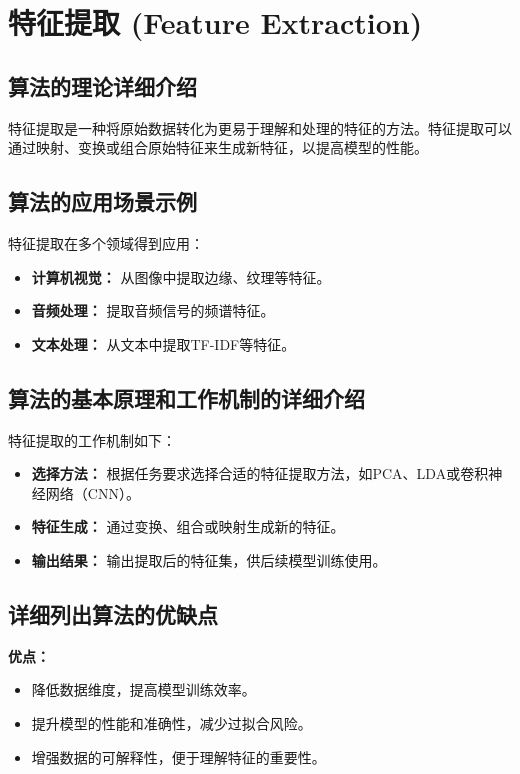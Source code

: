 \section{特征提取 (Feature Extraction)}
\subsection*{算法的理论详细介绍}
特征提取是一种将原始数据转化为更易于理解和处理的特征的方法。特征提取可以通过映射、变换或组合原始特征来生成新特征，以提高模型的性能。

\subsection*{算法的应用场景示例}
特征提取在多个领域得到应用：
\begin{itemize}
    \item \textbf{计算机视觉：} 从图像中提取边缘、纹理等特征。
    \item \textbf{音频处理：} 提取音频信号的频谱特征。
    \item \textbf{文本处理：} 从文本中提取TF-IDF等特征。
\end{itemize}

\subsection*{算法的基本原理和工作机制的详细介绍}
特征提取的工作机制如下：
\begin{itemize}
    \item \textbf{选择方法：} 根据任务要求选择合适的特征提取方法，如PCA、LDA或卷积神经网络（CNN）。
    \item \textbf{特征生成：} 通过变换、组合或映射生成新的特征。
    \item \textbf{输出结果：} 输出提取后的特征集，供后续模型训练使用。
\end{itemize}

\subsection*{详细列出算法的优缺点}
\textbf{优点：}
\begin{itemize}
    \item 降低数据维度，提高模型训练效率。
    \item 提升模型的性能和准确性，减少过拟合风险。
    \item 增强数据的可解释性，便于理解特征的重要性。
\end{itemize}

